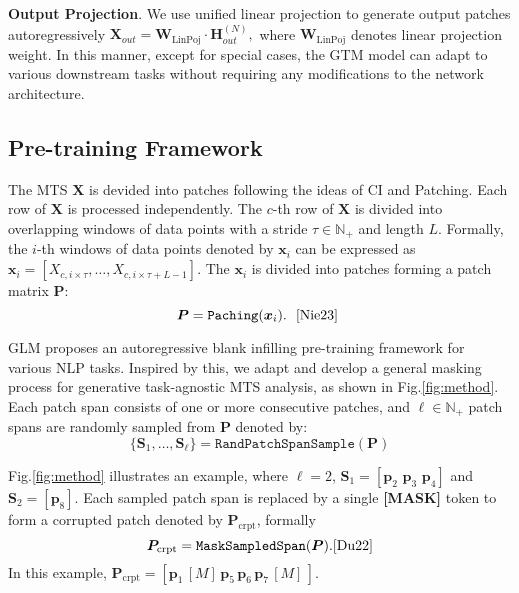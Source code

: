 \textbf{Output Projection}. We use unified linear projection to generate output patches autoregressively 
$
    \bm{X}_{out} = \bm{W}_{\text{LinPoj}}\cdot \bm{H}_{out}^{(N)}, 
$
where $\bm{W}_{\text{LinPoj}}$ denotes linear projection weight. In this manner, except for special cases, the GTM model can adapt to various downstream tasks without requiring any modifications to the network architecture.

\subsection{Pre-training Framework}
\label{sec:pre-tain}

The MTS $\bm{X}$ is devided into patches following the ideas of 
CI and Patching\cite{Nie23}.  
Each row of $\bm{X}$ is processed independently.
The $c$-th row of $\bm{X}$ is divided 
into overlapping windows of data points with a stride 
$\tau \in \mathbb{N}_+$ and length $L$. 
Formally, the $i$-th windows of data points denoted by $\bm{x}_i$ 
can be expressed as  
$ 
\bm{x}_{i} 
= 
[X_{c,i\times \tau}, \ldots, 
X_{c,i\times \tau + L -1}
].   
$   
The $\bm{x}_{i}$ is divided into patches forming a patch matrix 
$\bm{P}$:
\[
\bm{P} 
= 
\texttt{Paching} 
(\bm{x}_{i}). 
\,\, \text{ \cite{Nie23} }
\] 

GLM \cite{Du22} proposes an autoregressive blank infilling pre-training framework for various NLP tasks. Inspired by this, we adapt and develop a general masking process for generative task-agnostic MTS analysis, as shown in Fig.\ref{fig:method}.  
Each patch span consists of one or more consecutive patches, 
and $\ell \in \mathbb{N}_+$ patch spans are randomly sampled 
from $\bm{P}$ denoted by: 
\[
\{ \bm{S}_1, \ldots, \bm{S}_{\ell} \} 
=\texttt{RandPatchSpanSample} (\bm{P})
\]
 
Fig.\ref{fig:method} illustrates an example, where $\ell=2$, 
$\bm{S}_1 = [\bm{p}_2 \,\, \bm{p}_3 \,\, \bm{p}_4]$ and 
$\bm{S}_2 = [\bm{p}_8]$.  
Each sampled patch span is replaced by a single \textbf{[MASK]} token 
to form a corrupted patch denoted by $\bm{P}_{\text{crpt}}$, formally  
\[
\bm{P}_{\text{crpt}} 
= 
\texttt{MaskSampledSpan} 
(\bm{P}).  \text{\cite{Du22}}
\] 
In this example,   
$\bm{P}_{\text{crpt}} = [\bm{p}_1  \, [M] \, \bm{p}_5 \, \bm{p}_6 \, \bm{p}_7 \, [M] \, ]$. 



